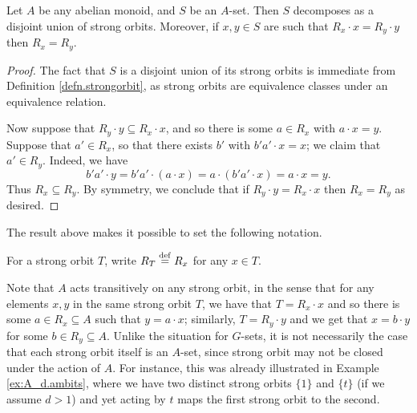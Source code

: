 \documentclass[11pt]{amsart}
\begin{document}
\begin{proposition}\label{disjoint.union.of.ambits}
  Let $A$ be any abelian monoid, and $S$ be an $A$-set. Then $S$ decomposes as a disjoint union of strong orbits.  Moreover, if $x,y\in S$ are such that $R_x \cdot x = R_y \cdot y$ then $R_x = R_y$.
\end{proposition}
\begin{proof}


The fact that $S$ is a disjoint union of its strong orbits is immediate from Definition \ref{defn.strongorbit}, as strong orbits are equivalence classes under an equivalence relation. 

    Now suppose that $R_y \cdot y \subseteq R_x \cdot x$, and so there is some $a\in R_x$ with $a \cdot x = y$.  Suppose that $a'\in R_x$, so that there exists $b'$ with $b'a'\cdot x = x$; we claim that $a'\in R_y$.  Indeed, we have 
    \[b'a' \cdot y = b'a' \cdot (a\cdot x) = a \cdot (b'a'\cdot x) = a\cdot x = y.\]
    Thus $R_x \subseteq R_y$. By symmetry, we conclude that if $R_y \cdot y = R_x \cdot x$ then $R_x = R_y$ as desired.
\end{proof}

The result above makes it possible to set the following notation.

\begin{definition} \label{def:R_T}
    For a strong orbit $T$, write $R_T\mathrel{\stackrel{\mathrm{def}}=} R_x$ for any $x\in T$.
\end{definition}

Note that $A$ acts transitively on any strong orbit, in the sense that for any elements $x,y$ in the same strong orbit $T$, we have that $T=R_x\cdot x$ and so there is some $a\in R_x\subseteq A$ such that $y=a\cdot x$; similarly, $T=R_y\cdot y$ and we get that $x=b\cdot y$ for some $b\in R_y\subseteq A$. Unlike the situation for $G$-sets, it is not necessarily the case that each strong orbit itself is an $A$-set, since strong orbit may not be closed under the action of $A$. For instance, this was already illustrated in Example \ref{ex:A_d.ambits}, where we have two distinct strong orbits $\{1\}$ and $\{t\}$ (if we assume $d>1$) and yet acting by $t$ maps the first strong orbit to the second. 
\end{document}
